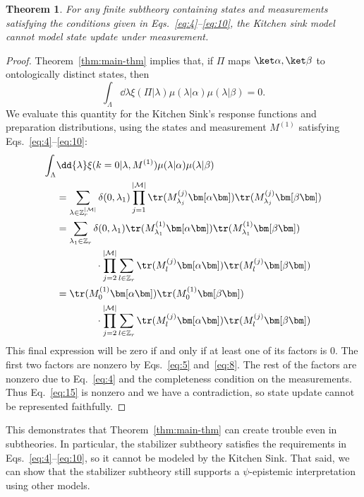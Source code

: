 \documentclass[%
 reprint,
superscriptaddress,
nofootinbib,
 amsmath,amssymb,
 prx, 
 accepted=2019-09-27,
]{quantumarticle}
\newtheorem{theorem}{Theorem}
\newcommand{\Z}{\mathbb{Z}}
\newcommand{\m}{{\left| \mathcal M \right |}}
\newcommand{\proj}[1]{{\bm[}#1{\bm]}}
\begin{document}
\begin{theorem}
  For any finite subtheory containing states and measurements
  satisfying the conditions given in Eqs.~\ref{eq:4}--\ref{eq:10}, the
  Kitchen sink model cannot model state update under measurement.
\end{theorem}
\begin{proof}
  Theorem~\ref{thm:main-thm} implies that, if $\Pi$ maps
  $\ket\alpha,\ket\beta$ to ontologically distinct states, then
  \begin{equation}
    \label{eq:21}
    \int_\Lambda\dd{\lambda} \xi(\Pi|\lambda)\mu(\lambda|\alpha)\mu(\lambda|\beta) = 0.
  \end{equation}
  We evaluate this quantity for the Kitchen Sink's response functions
  and preparation distributions, using the states and measurement $M^{(1)}$ satisfying
  Eqs.~\ref{eq:4}--\ref{eq:10}:
  \begin{align}
    \int_\Lambda&\dd{\lambda} \xi(k=0|\lambda,M^{(1)})\mu(\lambda|\alpha)\mu(\lambda|\beta)      \nonumber\\
                & =\sum_{\lambda\in\Z_r^\m} \delta(0,\lambda_1)\prod_{j=1}^\m\tr(M^{(j)}_{\lambda_j}\proj\alpha)\tr(M^{(j)}_{\lambda_j}\proj\beta) \nonumber\\
                & = \sum_{\lambda_1\in\Z_r}\delta(0,\lambda_1)\tr(M^{(1)}_{\lambda_1}\proj\alpha)\tr(M^{(1)}_{\lambda_1}\proj\beta)\nonumber\\
                &\qquad\qquad\cdot\prod_{j=2}^\m\sum_{l\in\Z_r}\tr(M^{(j)}_l\proj\alpha)\tr(M^{(j)}_l\proj\beta)     \nonumber\\
                & = \tr(M^{(1)}_0\proj\alpha)\tr(M^{(1)}_0\proj\beta)\nonumber\\
                &\qquad\qquad\cdot\prod_{j= 2}^\m\sum_{l\in\Z_r}\tr(M^{(j)}_l\proj\alpha)\tr(M^{(j)}_l\proj\beta)   \label{eq:15}
  \end{align}
  This final expression will be zero if and only if at least one of
  its factors is 0. The first two factors are nonzero by
  Eqs.~\ref{eq:5} and~\ref{eq:8}. The rest of the factors are nonzero
  due to Eq.~\ref{eq:4} and the completeness condition on the
  measurements.  Thus Eq.~\ref{eq:15} is nonzero and we have a
  contradiction, so state update cannot be represented faithfully.
\end{proof}

This demonstrates that Theorem~\ref{thm:main-thm} can create trouble
even in subtheories. In particular, the stabilizer subtheory satisfies
the requirements in Eqs.~\ref{eq:4}--\ref{eq:10}, so it cannot be
modeled by the Kitchen Sink. That said, we can show that the
stabilizer subtheory still supports a $\psi$-epistemic interpretation
using other models.
\end{document}
